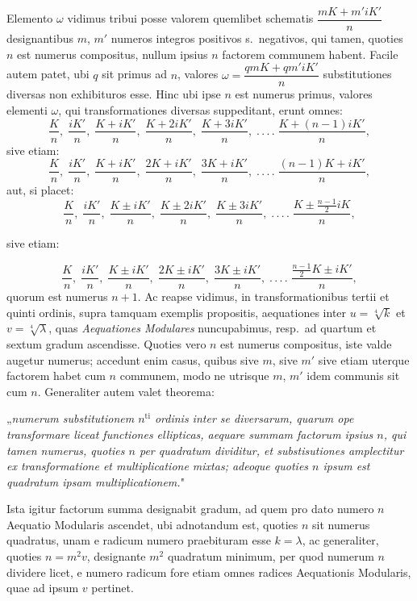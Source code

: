 \documentclass{article}
\begin{document}
Elemento $\omega$ vidimus tribui posse valorem quemlibet schematis $\dfrac{mK+m'iK'}{n}$ designantibus $m$, $m'$ numeros integros positivos s.\ negativos, qui tamen, quoties $n$ est numerus compositus, nullum ipsius $n$ factorem communem habent. Facile autem patet, ubi $q$ sit primus ad $n$, valores $\omega=\dfrac{qmK+qm'iK'}{n}$ substitutiones diversas non exhibituros esse. Hinc ubi ipse $n$ est numerus primus, valores elementi $\omega$, qui transformationes diversas suppeditant, erunt omnes:
\[
\frac{K}{n},\;\frac{iK'}{n},\;\frac{K+iK'}{n},\;\frac{K+2iK'}{n},\;\frac{K+3iK'}{n},\;.\,.\,.\,.\;\frac{K+(n-1)iK'}{n},
\]
sive etiam:
\[
\frac{K}{n},\;\frac{iK'}{n},\;\frac{K+iK'}{n},\;\frac{2K+iK'}{n},\;\frac{3K+iK'}{n},\;.\,.\,.\,.\;\frac{(n-1)K+iK'}{n},
\]
aut, si placet:
\[
\frac{K}{n},\;\frac{iK'}{n},\;\frac{K\pm iK'}{n},\;\frac{K\pm2iK'}{n},\;\frac{K\pm3iK'}{n},\;.\,.\,.\,.\;\frac{K\pm\frac{n-1}{2}iK}{n},
\]

sive etiam:

\[
\frac{K}{n},\;\frac{iK'}{n},\;\frac{K\pm iK'}{n},\;\frac{2K\pm iK'}{n},\;\frac{3K\pm iK'}{n},\;.\,.\,.\,.\;\frac{\frac{n-1}{2}K\pm iK'}{n},
\]
quorum est numerus $n+1$. Ac reapse vidimus, in transformationibus tertii et quinti ordinis, supra tamquam exemplis propositis, aequationes inter $u=\sqrt[4]{k}$ et $v=\sqrt[4]{\lambda}$, quas \emph{Aequationes Modulares} nuncupabimus, resp.\ ad quartum et sextum gradum ascendisse. Quoties vero $n$ est numerus compositus, iste valde augetur numerus; accedunt enim casus, quibus sive $m$, sive $m'$ sive etiam uterque factorem habet cum $n$ communem, modo ne utrisque $m$, $m'$ idem communis sit cum $n$. Generaliter autem valet theorema:

„\emph{numerum substitutionem $n^{\mathrm{ti}}$ ordinis inter se diversarum, quarum ope transformare liceat functiones ellipticas, aequare summam factorum ipsius $n$, qui tamen numerus, quoties $n$ per quadratum dividitur, et substisutiones amplectitur ex transformatione et multiplicatione mixtas; adeoque quoties $n$ ipsum est quadratum ipsam multiplicationem.}"

Ista igitur factorum summa designabit gradum, ad quem pro dato numero $n$ Aequatio Modularis ascendet, ubi adnotandum est, quoties $n$ sit numerus quadratus, unam e radicum numero praebituram esse $k=\lambda$, ac generaliter, quoties $n=m^{2}v$, designante $m^{2}$ quadratum minimum, per quod numerum $n$ dividere licet, e numero radicum fore etiam omnes radices Aequationis Modularis, quae ad ipsum $v$ pertinet.
\end{document}
